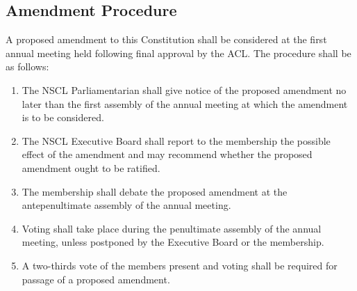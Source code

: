 \documentclass{bylaws}
\newcommand{\NSCL}{\textsc{NSCL}\xspace}
\newcommand{\ACL}{\textsc{ACL}\xspace}
\begin{document}
\begin{linenumbers}[1]
  \section{Amendment Procedure}
  A proposed amendment to this Constitution shall be considered at the
  first annual meeting held following final approval by the \ACL. The
  procedure shall be as follows:
  \begin{enumerate}
  \item The \NSCL Parliamentarian shall give notice of the proposed
    amendment no later than the first assembly of the annual meeting at
    which the amendment is to be considered.
  \item The \NSCL Executive Board shall report to the membership the
    possible effect of the amendment and may recommend whether the
    proposed amendment ought to be ratified.
  \item The membership shall debate the proposed amendment at the
    antepenultimate assembly of the annual meeting.
  \item Voting shall take place during the penultimate assembly of the
    annual meeting, unless postponed by the Executive Board or the
    membership.
  \item A two-thirds vote of the members present and voting shall be
    required for passage of a proposed amendment.
  \end{enumerate}

\end{linenumbers}

\pagebreak

\end{document}
